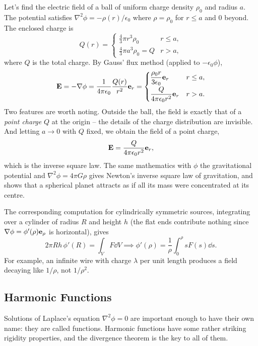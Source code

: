 \documentclass[a4paper]{scrartcl}
\begin{document}
\begin{example}
	Let's find the electric field of a ball of uniform charge density $\rho_0$ and radius $a$. The potential satisfies $\nabla^2 \phi = -\rho(r)/\epsilon_0$ where $\rho = \rho_0$ for $r \leq a$ and $0$ beyond. The enclosed charge is
	$$
	Q(r) = \begin{cases}
		\frac{4}{3}\pi r^3 \rho_0 & r \leq a, \\
		\frac{4}{3}\pi a^3 \rho_0 = Q & r > a,
	\end{cases}
	$$
	where $Q$ is the total charge. By Gauss' flux method (applied to $-\epsilon_0 \phi$),
	$$
	\mathbf{E} = -\nabla \phi = \frac{1}{4 \pi \epsilon_0}\frac{Q(r)}{r^2} \mathbf{e}_r = \begin{cases}
		\dfrac{\rho_0 r}{3 \epsilon_0} \mathbf{e}_r & r \leq a, \\[6pt]
		\dfrac{Q}{4 \pi \epsilon_0 r^2} \mathbf{e}_r & r > a.
	\end{cases}
	$$
	Two features are worth noting. Outside the ball, the field is exactly that of a \emph{point charge} $Q$ at the origin -- the details of the charge distribution are invisible. And letting $a \to 0$ with $Q$ fixed, we obtain the field of a point charge,
	$$
	\mathbf{E} = \frac{Q}{4 \pi \epsilon_0 r^2} \mathbf{e}_r,
	$$
	which is the inverse square law. The same mathematics with $\phi$ the gravitational potential and $\nabla^2 \phi = 4 \pi G \rho$ gives Newton's inverse square law of gravitation, and shows that a spherical planet attracts as if all its mass were concentrated at its centre.
\end{example}

The corresponding computation for cylindrically symmetric sources, integrating over a cylinder of radius $R$ and height $h$ (the flat ends contribute nothing since $\nabla \phi = \phi'(\rho) \mathbf{e}_\rho$ is horizontal), gives
$$
2 \pi R h \, \phi'(R) = \int_V F \dd V \implies \phi'(\rho) = \frac{1}{\rho}\int_0^\rho s F(s) \dd s.
$$
For example, an infinite wire with charge $\lambda$ per unit length produces a field decaying like $1/\rho$, not $1/\rho^2$.

\subsection{Harmonic Functions}

Solutions of Laplace's equation $\nabla^2 \phi = 0$ are important enough to have their own name: they are called  functions. Harmonic functions have some rather striking rigidity properties, and the divergence theorem is the key to all of them.
\end{document}
